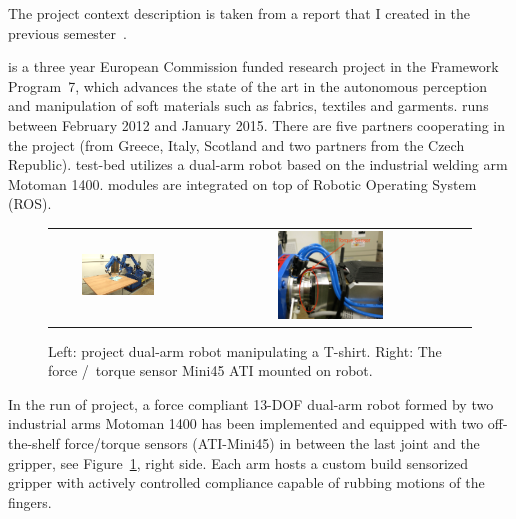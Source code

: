         The project context description is taken from a report that I created in the previous semester~\cite{PreDiplomaLejsekHlavac}.


        \CloPeMa\/ is a three year European Commission funded research project in the Framework Program~7, which advances the state of the art in the autonomous perception and manipulation of soft materials such as fabrics, textiles and garments. \CloPeMa\/ runs  between February 2012 and January 2015. There are five partners cooperating in the project (from Greece, Italy, Scotland and two partners from the Czech Republic). \CloPeMa\/ test-bed utilizes a dual-arm robot based on the industrial welding arm Motoman 1400. \CloPeMa\/ modules are integrated on top of Robotic Operating System (ROS).

        \begin{figure}[h]
        \centering
        \begin{tabular}{cc}
        \includegraphics[width=0.57\textwidth]{tshirt02.png}
        &
        \includegraphics[width=0.39\textwidth]{CloPeMaForceTorqueSensorSmAnnotatedCrop}
        \end{tabular}
        \caption{Left: \CloPeMa\/ project dual-arm robot manipulating a T-shirt. Right: The force /~torque sensor Mini45 ATI mounted on \CloPeMa\/ robot.}
        \label{fig:CloPeMaRobot-and-FTsensor}
        \end{figure}

        In the run of \CloPeMa\/ project, a force compliant 13-DOF dual-arm robot formed by two industrial arms Motoman 1400 has been implemented and equipped with two off-the-shelf force/torque sensors (ATI-Mini45) in between the last joint and the gripper, see Figure~\ref{fig:CloPeMaRobot-and-FTsensor}, right side. Each arm hosts a custom build sensorized gripper with actively controlled compliance capable of rubbing motions of the fingers.

